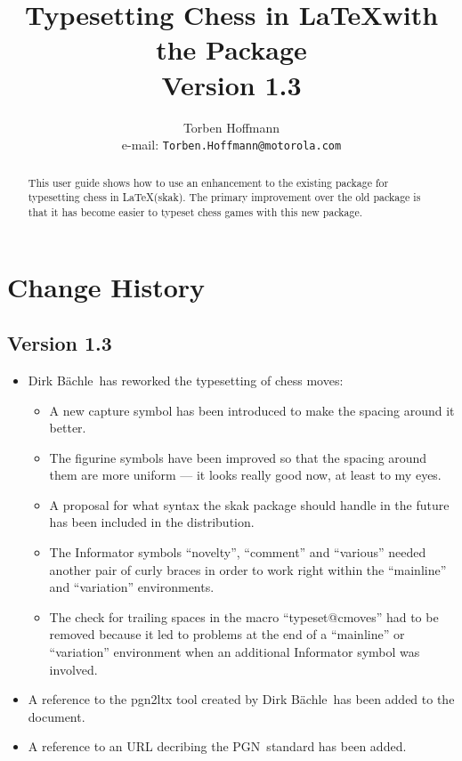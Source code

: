 \documentclass[11pt,twocolumn]{article}
\title{Typesetting Chess in \LaTeX with the \package{skak} Package\\
Version 1.3}
\author{Torben Hoffmann\\ e-mail: \texttt{Torben.Hoffmann@motorola.com}}
\newcommand{\package}[1]{\textsf{#1}}
\newcommand{\pgn}{PGN\ }
\newcommand{\Dirk}{Dirk B\"achle\ }
\begin{document}
\maketitle

\begin{abstract}
  This user guide shows how to use an enhancement to the existing
  package for typesetting chess in \LaTeX (\package{skak}). The
  primary improvement over the old package is that it has become
  easier to typeset chess games with this new package.
\end{abstract}

\newpage
\tableofcontents
\newpage

\section{Change History}
\label{sec:change-history}


\subsection*{Version 1.3}
\label{sec:version-1.3}

\begin{itemize}
\item \Dirk has reworked the typesetting of chess moves:
  \begin{itemize}
  \item A new capture symbol has been introduced to make the spacing around
    it better.
  \item The figurine symbols have been improved so that the spacing around
    them are more uniform --- it looks really good now, at least to my eyes.
  \item A proposal for what syntax the \package{skak} package should handle in
    the future has been included in the distribution.
  \item The Informator symbols ``novelty'', ``comment'' and ``various'' needed
    another pair of curly braces in order to work right within the
    ``mainline'' and ``variation'' environments.
  \item The check for trailing spaces in the macro ``typeset@cmoves'' had to
    be removed because it led to problems at the end of a ``mainline'' or
    ``variation'' environment when an additional Informator symbol was
    involved.      
  \end{itemize}
\item A reference to the \textsf{pgn2ltx} tool created by \Dirk has been added
  to the document.
\item A reference to an URL decribing the \pgn standard has been added.
\end{itemize}
\end{document}
